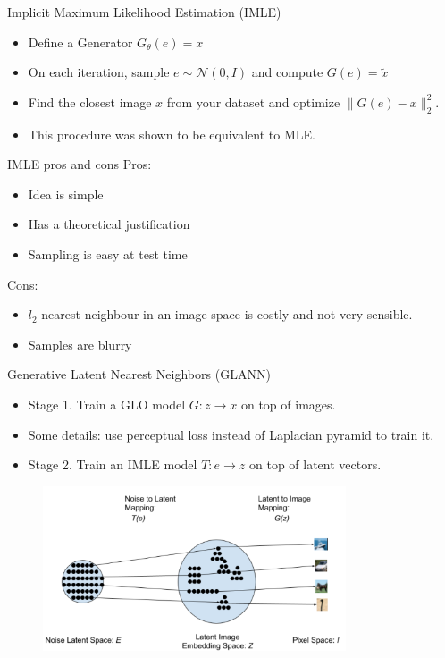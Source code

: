 \documentclass[10pt]{beamer}
\begin{document}
\begin{frame}{Implicit Maximum Likelihood Estimation (IMLE)}
    \begin{itemize}
        \item\pause Define a Generator $G_\theta(e) = x$
        \item\pause On each iteration, sample $e \sim \mathcal{N}(0, I)$ and compute $G(e) = \tilde{x}$
        \item\pause Find the closest image $x$ from your dataset and optimize $\| G(e) - x \|_2^2$.
        \item\pause This procedure was shown to be equivalent to MLE.
    \end{itemize}
\end{frame}

\begin{frame}{IMLE pros and cons}
    Pros:
    \begin{itemize}
        \item\pause Idea is simple
        \item\pause Has a theoretical justification
        \item\pause Sampling is easy at test time
    \end{itemize}
    
    Cons:
    \begin{itemize}
        \item\pause $l_2$-nearest neighbour in an image space is costly and not very sensible.
        \item\pause Samples are blurry
    \end{itemize}
\end{frame}


\begin{frame}{Generative Latent Nearest Neighbors (GLANN)}
    \begin{itemize}
        \item\pause Stage 1. Train a GLO model $G:z \to x$ on top of images.
        \item\pause Some details: use perceptual loss instead of Laplacian pyramid to train it.
        \item\pause Stage 2. Train an IMLE model $T:e \to z$ on top of latent vectors.
    \end{itemize}
    
    \begin{figure}
        \centering
        \includegraphics[width=0.8\textwidth]{images/glann}
    \end{figure}
\end{frame}
\end{document}
